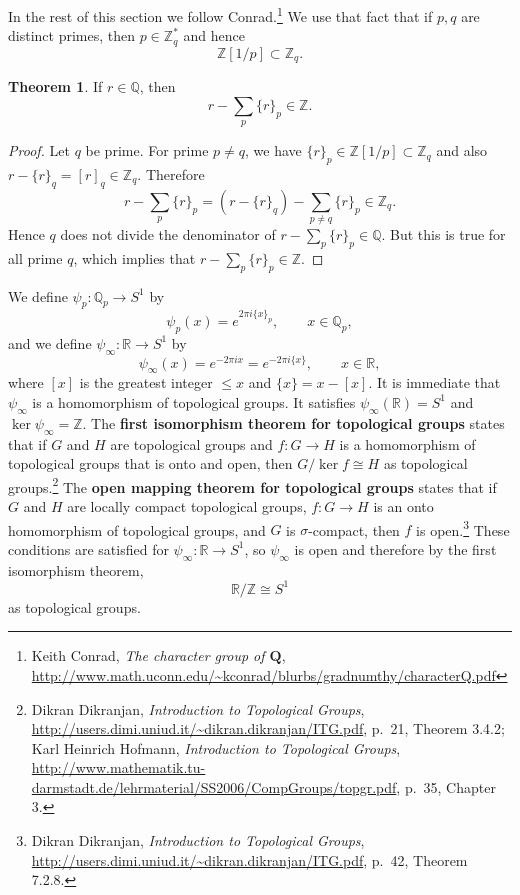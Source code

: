 \documentclass{article}
\theoremstyle{definition}
\newtheorem{theorem}{Theorem}
\theoremstyle{definition}
\begin{document}
In the rest of this section we follow Conrad.\footnote{Keith Conrad, {\em The character group of $\mathbf{Q}$}, \url{http://www.math.uconn.edu/~kconrad/blurbs/gradnumthy/characterQ.pdf}} We use that fact that if $p,q$ are distinct primes, then $p \in \mathbb{Z}_q^*$ and hence
\[
\mathbb{Z}[1/p] \subset \mathbb{Z}_q.
\]

\begin{theorem}
If $r \in \mathbb{Q}$, then
\[
r-\sum_p \{r\}_p \in \mathbb{Z}.
\]
\label{rationaldecomp}
\end{theorem}
\begin{proof}
Let $q$ be prime. For prime $p \neq q$, we have $\{r\}_p \in \mathbb{Z}[1/p] \subset \mathbb{Z}_q$ 
and  also $r-\{r\}_q = [r]_q \in \mathbb{Z}_q$. Therefore
\[
r-\sum_p \{r\}_p = (r-\{r\}_q) - \sum_{p \neq q} \{r\}_p \in \mathbb{Z}_q.
\]
Hence $q$ does not divide the denominator of $r-\sum_p \{r\}_p \in \mathbb{Q}$. But this is true for all prime $q$, which implies that $r-\sum_p \{r\}_p \in \mathbb{Z}$.
\end{proof}

We define $\psi_p:\mathbb{Q}_p \to S^1$ by
\[
\psi_p(x) = e^{2\pi i\{x\}_p}, \qquad x \in \mathbb{Q}_p,
\]
and we define $\psi_\infty:\mathbb{R} \to S^1$ by
\[
\psi_\infty(x)  = e^{-2\pi ix}= e^{-2\pi i\{x\}}, \qquad x \in \mathbb{R},
\]
where $[x]$ is the greatest integer $\leq x$ and $\{x\}=x-[x]$. 
It is immediate that $\psi_\infty$ is a homomorphism of topological groups. It satisfies $\psi_\infty(\mathbb{R})=S^1$ and
$\ker \psi_\infty = \mathbb{Z}$. The \textbf{first isomorphism theorem for topological groups} states that if 
$G$ and $H$ are topological groups and $f:G \to H$ is a homomorphism of topological groups that is onto and open, then
$G/\ker f \cong H$ as topological groups.\footnote{Dikran Dikranjan, {\em Introduction to Topological Groups},
\url{http://users.dimi.uniud.it/~dikran.dikranjan/ITG.pdf}, p.~21, Theorem 3.4.2;
Karl Heinrich Hofmann, {\em Introduction to Topological Groups},
\url{http://www.mathematik.tu-darmstadt.de/lehrmaterial/SS2006/CompGroups/topgr.pdf}, p.~35, Chapter 3.}
The \textbf{open mapping theorem for topological groups} states that if $G$ and $H$ are locally compact topological
groups, $f:G \to H$ is an onto homomorphism of topological groups, and $G$ is $\sigma$-compact, then
$f$ is open.\footnote{Dikran Dikranjan, {\em Introduction to Topological Groups},
\url{http://users.dimi.uniud.it/~dikran.dikranjan/ITG.pdf}, p.~42, Theorem 7.2.8.}
These conditions are satisfied for $\psi_\infty:\mathbb{R} \to S^1$, so $\psi_\infty$ is open and therefore
by the first isomorphism theorem,
\[
\mathbb{R}/\mathbb{Z} \cong S^1
\]
as topological groups.
\end{document}
